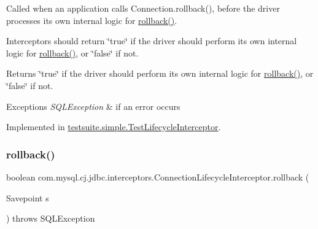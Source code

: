 Called when an application calls Connection.\+rollback(), before the driver processes its own internal logic for \mbox{\hyperlink{interfacecom_1_1mysql_1_1cj_1_1jdbc_1_1interceptors_1_1_connection_lifecycle_interceptor_a0659ae7aff8c74e8236b82deccee4fed}{rollback()}}.

Interceptors should return \char`\"{}true\char`\"{} if the driver should perform its own internal logic for \mbox{\hyperlink{interfacecom_1_1mysql_1_1cj_1_1jdbc_1_1interceptors_1_1_connection_lifecycle_interceptor_a0659ae7aff8c74e8236b82deccee4fed}{rollback()}}, or \char`\"{}false\char`\"{} if not.

\begin{DoxyReturn}{Returns}
\char`\"{}true\char`\"{} if the driver should perform its own internal logic for \mbox{\hyperlink{interfacecom_1_1mysql_1_1cj_1_1jdbc_1_1interceptors_1_1_connection_lifecycle_interceptor_a0659ae7aff8c74e8236b82deccee4fed}{rollback()}}, or \char`\"{}false\char`\"{} if not.
\end{DoxyReturn}

\begin{DoxyExceptions}{Exceptions}
{\em S\+Q\+L\+Exception} & if an error occurs \\
\hline
\end{DoxyExceptions}


Implemented in \mbox{\hyperlink{classtestsuite_1_1simple_1_1_test_lifecycle_interceptor_a7cdeb42f7891e22dadce89627befbcdf}{testsuite.\+simple.\+Test\+Lifecycle\+Interceptor}}.

\mbox{\label{interfacecom_1_1mysql_1_1cj_1_1jdbc_1_1interceptors_1_1_connection_lifecycle_interceptor_a1f2f30024dbf49bcfde29842f5e2d677}} 
\subsubsection{\texorpdfstring{rollback()}{rollback()}\hspace{0.1cm}{\footnotesize\ttfamily [2/2]}}
{\footnotesize\ttfamily boolean com.\+mysql.\+cj.\+jdbc.\+interceptors.\+Connection\+Lifecycle\+Interceptor.\+rollback (\begin{DoxyParamCaption}\item[{Savepoint}]{s }\end{DoxyParamCaption}) throws S\+Q\+L\+Exception}

